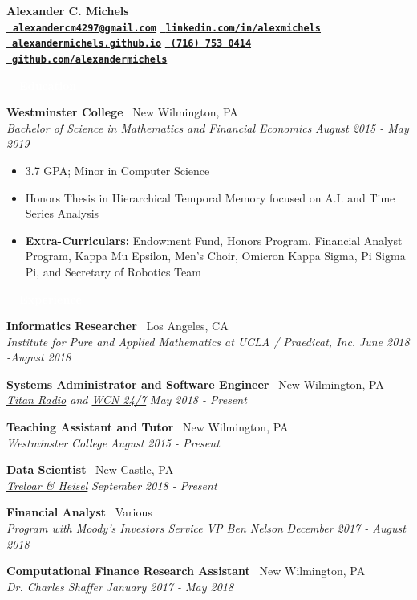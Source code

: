 \documentclass[letterpaper,11pt]{article}
\newcommand{\resitem}[1]{\item[--] #1}
\newcommand{\resheading}[1]{{\vspace{2pt}\large \colorbox{electricpurple}{\begin{minipage}{\textwidth}{\textbf{#1 \vphantom{p\^{E}}}}\end{minipage}}}\vspace{3pt}}
\newcommand{\Position}[4]{
	\textbf{#1} \hfill \faMapPin \ #2 \\
	\textit{#3} \hfill \textit{#4} \\
	\vspace{1pt}
}
\newenvironment{titemize}{
	\vspace{-12pt}
	\begin{itemize}
		\setlength{\itemsep}{0pt}
		\setlength{\parskip}{0pt}
		\setlength{\topsep}{0pt}
}{\end{itemize}\vspace{-12pt}}
\begin{document}
	
	

		\textbf{\LARGE Alexander C. Michels} \\
	 \href{mailto:alexandercm4297@gmail.com}{\textbf{\faEnvelope \ \texttt{alexandercm4297@gmail.com}}} \hfill \href{https://www.linkedin.com/in/alexmichels/}{\faLinkedin \ \textbf{\texttt{linkedin.com/in/alexmichels}}} \\
	\href{http://alexandermichels.github.io}{\faGlobeAmericas \ \textbf{\texttt{alexandermichels.github.io}}} \hfill \href{tel:17167530414}{\faPhone \ \textbf{\texttt{(716) 753 0414}}} \hfill \href{https://github.com/alexandermichels}{\faGithub \ \textbf{\texttt{github.com/alexandermichels}}} \\
	
	\resheading{\textcolor{white}{\ \faGraduationCap \ Education}}

		\Position{Westminster College}{New Wilmington, PA}{Bachelor of Science in Mathematics and Financial Economics}{August 2015 - May 2019}
		\begin{titemize}
			\resitem{3.7 GPA; Minor in Computer Science}
			\resitem{Honors Thesis in Hierarchical Temporal Memory focused on A.I. and Time Series Analysis}
			\resitem{\textbf{Extra-Curriculars: }Endowment Fund, Honors Program, Financial Analyst Program, Kappa Mu Epsilon, Men’s Choir, Omicron Kappa Sigma, Pi Sigma Pi, and Secretary of Robotics Team}
		\end{titemize}
	
	\resheading{\textcolor{white}{\ \faBriefcase  \  Experience}}
	
		\Position{Informatics Researcher}{Los Angeles, CA}{Institute for Pure and Applied Mathematics at UCLA / Praedicat, Inc.}{June 2018 -August 2018}

		\Position{Systems Administrator and Software Engineer}{New Wilmington, PA}{\href{http://titanradio.net/}{Titan Radio} and \href{https://www.wcn247.com/}{WCN 24/7}}{May 2018 - Present}
		
		\Position{Teaching Assistant and Tutor}{New Wilmington, PA}{Westminster College}{August 2015 - Present}
		
		\Position{Data Scientist}{New Castle, PA}{\href{http://treloaronline.com/}{Treloar \& Heisel}}{September 2018 - Present}
		
		\Position{Financial Analyst}{Various}{Program with Moody’s Investors Service VP Ben Nelson}{December 2017 - August 2018}

		\Position{Computational Finance Research Assistant}{New Wilmington, PA}{Dr. Charles Shaffer}{January 2017 - May 2018}
\end{document}
